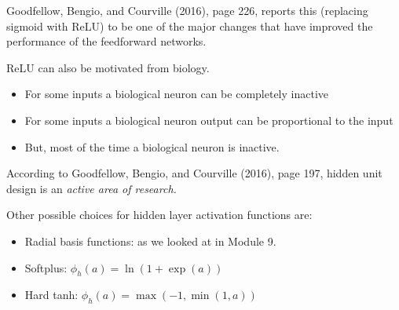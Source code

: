 \documentclass[10pt,ignorenonframetext,]{beamer}
\providecommand{\tightlist}{%
  \setlength{\itemsep}{0pt}\setlength{\parskip}{0pt}}
\begin{document}
\begin{frame}

Goodfellow, Bengio, and Courville (2016), page 226, reports this
(replacing sigmoid with ReLU) to be one of the major changes that have
improved the performance of the feedforward networks.

ReLU can also be motivated from biology.

\begin{itemize}
\tightlist
\item
  For some inputs a biological neuron can be completely inactive
\item
  For some inputs a biological neuron output can be proportional to the
  input
\item
  But, most of the time a biological neuron is inactive.
\end{itemize}

According to Goodfellow, Bengio, and Courville (2016), page 197, hidden
unit design is an \emph{active area of research.}

\end{frame}

\begin{frame}

Other possible choices for hidden layer activation functions are:

\begin{itemize}
\tightlist
\item
  Radial basis functions: as we looked at in Module 9.
\item
  Softplus: \(\phi_h(a)=\ln(1+\exp(a))\)
\item
  Hard tanh: \(\phi_h(a)=\max(-1,\min(1,a))\)
\end{itemize}

\end{frame}
\end{document}
